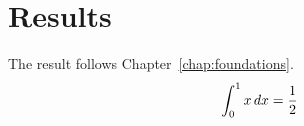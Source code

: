 \chapter{Results}\label{chap:results}
The result follows Chapter~\ref{chap:foundations}.
\begin{equation}\label{eq:book}
\int_0^1 x\,dx = \frac{1}{2}
\end{equation}
